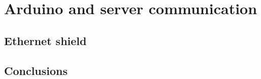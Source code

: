 \chapter{Arduino and server communication}\label{cap:implementacion}

\section{Ethernet shield}


\section{Conclusions}


